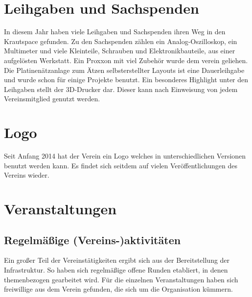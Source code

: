 \documentclass[10pt,DIV16]{scrartcl}
\begin{document}
\section{Leihgaben und Sachspenden}

In diesem Jahr haben viele Leihgaben und Sachspenden ihren Weg in den Krautspace gefunden. 
Zu den Sachspenden zählen ein Analog-Oszilloskop, ein Multimeter und viele Kleinteile, Schrauben und Elektronikbauteile, aus einer aufgelösten Werkstatt. 
Ein Proxxon mit viel Zubehör wurde dem verein geliehen. 
Die Platinenätzanlage zum Ätzen selbsterstellter Layouts ist eine Dauerleihgabe und wurde schon für einige Projekte benutzt. 
Ein besonderes Highlight unter den Leihgaben stellt der 3D-Drucker dar. 
Dieser kann nach Einweisung von jedem Vereinsmitglied genutzt werden. 

\section{Logo}

Seit Anfang 2014 hat der Verein ein Logo welches in unterschiedlichen Versionen benutzt werden kann. Es findet sich seitdem auf vielen Veröffentlichungen des Vereins wieder. 

\section{Veranstaltungen}

\subsection{Regelmäßige (Vereins-)aktivitäten}

Ein großer Teil der Vereinstätigkeiten ergibt sich aus der
Bereitstellung der Infrastruktur. So haben sich regelmäßige offene Runden
etabliert, in denen themenbezogen gearbeitet wird. Für die
einzelnen Veranstaltungen haben sich freiwillige aus dem Verein
gefunden, die sich um die Organisation kümmern.
\end{document}
